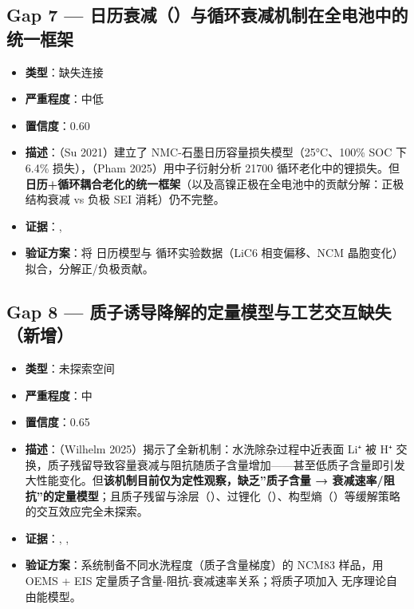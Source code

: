 \documentclass[12pt,a4paper]{ctexart}
\providecommand{\tightlist}{%
  \setlength{\itemsep}{0pt}\setlength{\parskip}{0pt}}
\begin{document}
\subsection{Gap 7 --- 日历衰减（\cite{p16}）与循环衰减机制在全电池中的统一框架}\label{gap:gap-7-ux65e5ux5386ux8870ux51cfp16ux4e0eux5faaux73afux8870ux51cfux673aux5236ux5728ux5168ux7535ux6c60ux4e2dux7684ux7edfux4e00ux6846ux67b6}

\begin{itemize}
\tightlist
\item
  \textbf{类型}：缺失连接
\item
  \textbf{严重程度}：中低
\item
  \textbf{置信度}：0.60
\item
  \textbf{描述}：\cite{p16}（Su 2021）建立了 NMC-石墨日历容量损失模型（25°C、100\% SOC 下 6.4\% 损失），\cite{p28}（Pham 2025）用中子衍射分析 21700 循环老化中的锂损失。但\textbf{日历+循环耦合老化的统一框架}（以及高镍正极在全电池中的贡献分解：正极结构衰减 vs 负极 SEI 消耗）仍不完整。
\item
  \textbf{证据}：\cite{p16}, \cite{p28}
\item
  \textbf{验证方案}：将 \cite{p16} 日历模型与 \cite{p28} 循环实验数据（LiC6 相变偏移、NCM 晶胞变化）拟合，分解正/负极贡献。
\end{itemize}

\subsection{Gap 8 --- 质子诱导降解的定量模型与工艺交互缺失（新增）}\label{gap:gap-8-ux8d28ux5b50ux8bf1ux5bfcux964dux89e3ux7684ux5b9aux91cfux6a21ux578bux4e0eux5de5ux827aux4ea4ux4e92ux7f3aux5931ux65b0ux589e}

\begin{itemize}
\tightlist
\item
  \textbf{类型}：未探索空间
\item
  \textbf{严重程度}：中
\item
  \textbf{置信度}：0.65
\item
  \textbf{描述}：\cite{p48}（Wilhelm 2025）揭示了全新机制：水洗除杂过程中近表面 Li⁺ 被 H⁺ 交换，质子残留导致容量衰减与阻抗随质子含量增加------甚至低质子含量即引发大性能变化。但\textbf{该机制目前仅为定性观察，缺乏''质子含量 → 衰减速率/阻抗''的定量模型}；且质子残留与涂层（\cite{p46}）、过锂化（\cite{p44}）、构型熵（\cite{p45}）等缓解策略的交互效应完全未探索。
\item
  \textbf{证据}：\cite{p48}, \cite{p46}, \cite{p44}
\item
  \textbf{验证方案}：系统制备不同水洗程度（质子含量梯度）的 NCM83 样品，用 OEMS + EIS 定量质子含量-阻抗-衰减速率关系；将质子项加入 \cite{p27} 无序理论自由能模型。
\end{itemize}
\end{document}
